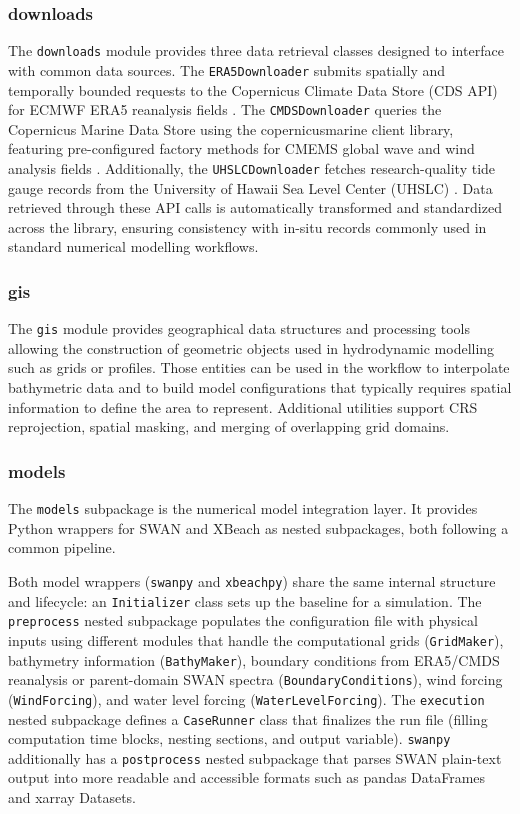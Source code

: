 \documentclass[preprint,12pt, a4paper]{elsarticle}
\begin{document}
\subsubsection{downloads}
The \texttt{downloads} module provides three data retrieval classes designed to interface with common data sources. The \texttt{ERA5Downloader} submits spatially and temporally bounded requests to the Copernicus Climate Data Store (CDS API) for ECMWF ERA5 reanalysis fields \cite{Hersbach_etal_2020}. The \texttt{CMDSDownloader} queries the Copernicus Marine Data Store using the copernicusmarine client library, featuring pre-configured factory methods for CMEMS global wave and wind analysis fields \cite{cmems_wav_001_027,cmems_wind_l4_nrt_012_004}. Additionally, the \texttt{UHSLCDownloader} fetches research-quality tide gauge records from the University of Hawaii Sea Level Center (UHSLC) \cite{Caldwell_etal_2015}. Data retrieved through these API calls is automatically transformed and standardized across the library, ensuring consistency with in-situ records commonly used in standard numerical modelling workflows.

\subsubsection{gis}
The \texttt{gis} module provides geographical data structures and processing tools allowing the construction of geometric objects used in hydrodynamic modelling such as grids or profiles. Those entities can be used in the workflow to interpolate bathymetric data and to build model configurations that typically requires spatial information to define the area to represent. Additional utilities support CRS reprojection, spatial masking, and merging of overlapping grid domains.

\subsubsection{models}
The \texttt{models} subpackage is the numerical model integration layer. It provides Python wrappers for SWAN and XBeach as nested subpackages, both following a common pipeline.

Both model wrappers (\texttt{swanpy} and \texttt{xbeachpy}) share the same internal structure and lifecycle: an \texttt{Initializer} class sets up the baseline for a simulation. The \texttt{preprocess} nested subpackage populates the configuration file with physical inputs using different modules that handle the computational grids (\texttt{GridMaker}), bathymetry information (\texttt{BathyMaker}), boundary conditions from ERA5/CMDS reanalysis or parent-domain SWAN spectra (\texttt{BoundaryConditions}), wind forcing (\texttt{WindForcing}), and water level forcing (\texttt{WaterLevelForcing}). The \texttt{execution} nested subpackage defines a \texttt{CaseRunner} class that finalizes the run file (filling computation time blocks, nesting sections, and output variable). \texttt{swanpy} additionally has a \texttt{postprocess} nested subpackage that parses SWAN plain-text output into more readable and accessible formats such as pandas DataFrames and xarray Datasets.
  
\end{document}
